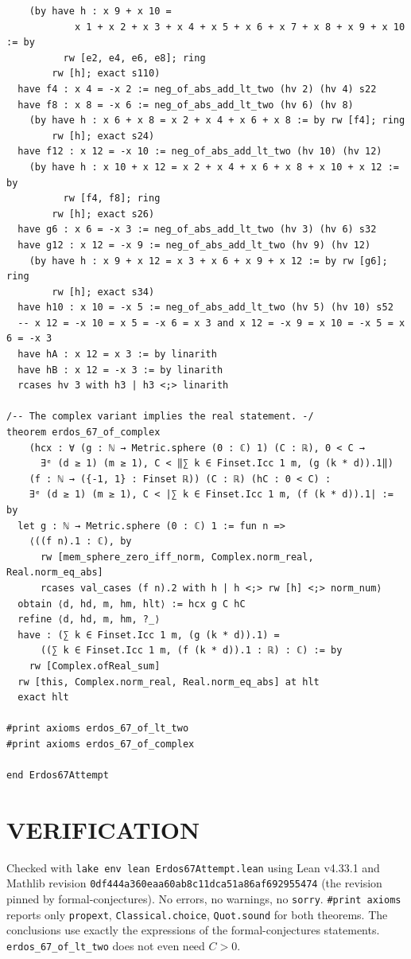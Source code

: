 \begin{verbatim}
    (by have h : x 9 + x 10 =
            x 1 + x 2 + x 3 + x 4 + x 5 + x 6 + x 7 + x 8 + x 9 + x 10 := by
          rw [e2, e4, e6, e8]; ring
        rw [h]; exact s110)
  have f4 : x 4 = -x 2 := neg_of_abs_add_lt_two (hv 2) (hv 4) s22
  have f8 : x 8 = -x 6 := neg_of_abs_add_lt_two (hv 6) (hv 8)
    (by have h : x 6 + x 8 = x 2 + x 4 + x 6 + x 8 := by rw [f4]; ring
        rw [h]; exact s24)
  have f12 : x 12 = -x 10 := neg_of_abs_add_lt_two (hv 10) (hv 12)
    (by have h : x 10 + x 12 = x 2 + x 4 + x 6 + x 8 + x 10 + x 12 := by
          rw [f4, f8]; ring
        rw [h]; exact s26)
  have g6 : x 6 = -x 3 := neg_of_abs_add_lt_two (hv 3) (hv 6) s32
  have g12 : x 12 = -x 9 := neg_of_abs_add_lt_two (hv 9) (hv 12)
    (by have h : x 9 + x 12 = x 3 + x 6 + x 9 + x 12 := by rw [g6]; ring
        rw [h]; exact s34)
  have h10 : x 10 = -x 5 := neg_of_abs_add_lt_two (hv 5) (hv 10) s52
  -- x 12 = -x 10 = x 5 = -x 6 = x 3 and x 12 = -x 9 = x 10 = -x 5 = x 6 = -x 3
  have hA : x 12 = x 3 := by linarith
  have hB : x 12 = -x 3 := by linarith
  rcases hv 3 with h3 | h3 <;> linarith

/-- The complex variant implies the real statement. -/
theorem erdos_67_of_complex
    (hcx : ∀ (g : ℕ → Metric.sphere (0 : ℂ) 1) (C : ℝ), 0 < C →
      ∃ᵉ (d ≥ 1) (m ≥ 1), C < ‖∑ k ∈ Finset.Icc 1 m, (g (k * d)).1‖)
    (f : ℕ → ({-1, 1} : Finset ℝ)) (C : ℝ) (hC : 0 < C) :
    ∃ᵉ (d ≥ 1) (m ≥ 1), C < |∑ k ∈ Finset.Icc 1 m, (f (k * d)).1| := by
  let g : ℕ → Metric.sphere (0 : ℂ) 1 := fun n =>
    ⟨((f n).1 : ℂ), by
      rw [mem_sphere_zero_iff_norm, Complex.norm_real, Real.norm_eq_abs]
      rcases val_cases (f n).2 with h | h <;> rw [h] <;> norm_num⟩
  obtain ⟨d, hd, m, hm, hlt⟩ := hcx g C hC
  refine ⟨d, hd, m, hm, ?_⟩
  have : (∑ k ∈ Finset.Icc 1 m, (g (k * d)).1) =
      ((∑ k ∈ Finset.Icc 1 m, (f (k * d)).1 : ℝ) : ℂ) := by
    rw [Complex.ofReal_sum]
  rw [this, Complex.norm_real, Real.norm_eq_abs] at hlt
  exact hlt

#print axioms erdos_67_of_lt_two
#print axioms erdos_67_of_complex

end Erdos67Attempt
\end{verbatim}

\section{VERIFICATION}
Checked with \texttt{lake env lean Erdos67Attempt.lean} using Lean v4.33.1 and Mathlib revision \texttt{0df444a360eaa60ab8c11dca51a86af692955474} (the revision pinned by formal-conjectures). No errors, no warnings, no \texttt{sorry}. \texttt{\#print axioms} reports only \texttt{propext}, \texttt{Classical.choice}, \texttt{Quot.sound} for both theorems. The conclusions use exactly the expressions of the formal-conjectures statements. \texttt{erdos\_67\_of\_lt\_two} does not even need $C>0$.

